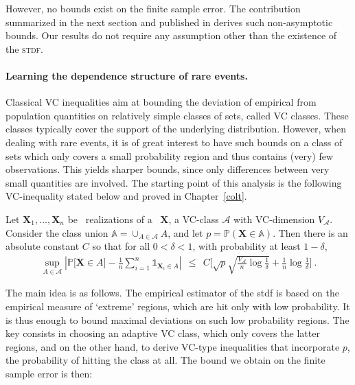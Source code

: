 However, no bounds exist on the finite sample error. The contribution summarized in the next section and published in \cite{COLT15} derives such non-asymptotic bounds. Our results do not require any assumption other than the existence of the \textsc{stdf}. 




\paragraph{Learning the dependence structure of rare events.}
Classical VC inequalities aim at bounding the deviation of empirical from population quantities on relatively simple classes of sets, called VC classes. These classes typically cover the support of the underlying distribution.  However, when dealing with rare events, it is of great interest to have such bounds on a class of sets which only covers a small probability region and thus contains (very) few observations. This yields sharper bounds, since only differences  between very small quantities are involved. The starting point of this analysis is the following VC-inequality stated below and proved in Chapter~\ref{colt}.
\begin{theorem}
\label{resume_fr:thm-princ} 
Let $\mathbf{X}_1,\ldots,\mathbf{X}_n$ be \iid~realizations of a \rv~$\mathbf{X}$, a VC-class $\mathcal{A}$ with VC-dimension $V_{\mathcal{A}}$. %
Consider the class union $\mathbb{A} = \cup_{A \in \mathcal{A}} A$,
 and let  
$p = \mathbb{P}(\mathbf{X} \in \mathbb{A})$. Then there is an absolute constant $C$ so that for all $0<\delta<1$, with probability at least $1-\delta$,
\begin{align*}
\sup_{A \in \mathcal{A}} \left| \mathbb{P} \big[\mathbf{X} \in A\big] - \frac{1}{n} \sum_{i=1}^n \mathds{1}_{\mathbf{X}_i \in A}  \right| ~~\le~~ C \bigg[ \sqrt{p}\sqrt{\frac{V_{\mathcal{A}}}{n} \log{\frac{1}{\delta}}} + \frac{1}{n} \log{\frac{1}{\delta}} \bigg]~.
\end{align*}
\end{theorem}


The main idea is as follows. The empirical estimator of the {\sc stdf} is based on the empirical measure of `extreme' regions, which  are hit only with  low probability. It is thus enough to bound  maximal deviations on such low probability regions. 
 The key consists in choosing an adaptive VC class, which only covers the latter regions, and on the other hand, to derive VC-type inequalities that incorporate $p$, the probability of hitting the class at all. The bound we obtain on the finite sample error is then:

